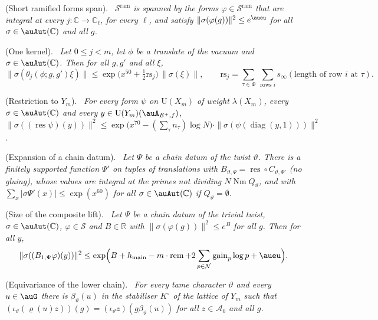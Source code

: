 \documentclass[10pt]{amsart}
\theoremstyle{definition}
\theoremstyle{remark}
\newcommand{\C}{\mathbb C}
\newcommand{\R}{\mathbb R}
\providecommand{\auAz}{\mathcal A_0}
\providecommand{\auNm}{\operatorname{Nm}}
\providecommand{\auPl}{\Phi}
\providecommand{\auS}{\mathcal S}
\providecommand{\auSram}{\mathcal S^{\mathrm{ram}}}
\providecommand{\auU}{\mathrm U}
\providecommand{\augain}{\operatorname{gain}}
\providecommand{\auhmain}{h_{\mathrm{main}}}
\providecommand{\aurem}{\operatorname{rem}}
\providecommand{\ausinf}{s_\infty}
\newenvironment{quotedthm}[2]{\par\medskip\noindent\begingroup
  \textbf{#1}#2.\ \itshape\ignorespaces}{\endgroup\par\medskip}
\begin{document}
\begin{quotedthm}{\cite[Proposition~14.22]{P46}}{ (Short ramified forms span)}
$\auSram$ is spanned by the forms $\varphi\in\auSram$ that are integral at every
$j\colon\C\to\C_\ell$, for every $\ell$, and satisfy $\|\sigma(\varphi(g))\|^2\le e^{\aueu}$ for
all $\sigma\in\auAut(\C)$ and all $g$.
\end{quotedthm}

\begin{quotedthm}{\cite[Proposition~14.23]{P46}}{ (One kernel)}
Let $0\le j<m$, let $\phi$ be a translate of the vacuum and $\sigma\in\auAut(\C)$. Then for all
$g,g'$ and all $\xi$,
\[
\|\sigma(\theta_j(\phi;g,g')\xi)\|\le\exp\bigl(x^{50}+\tfrac12\mathrm{rs}_j\bigr)\,\|\sigma(\xi)\|,
\qquad\mathrm{rs}_j=\sum_{\tau\in\auPl}\ \sum_{\text{rows }i}\ausinf(\text{length of row }i
\text{ at }\tau).
\]
\end{quotedthm}

\begin{quotedthm}{\cite[Proposition~14.24]{P46}}{ (Restriction to $Y_m$)}
For every form $\psi$ on $\auU(X_m)$ of weight $\lambda(X_m)$, every $\sigma\in\auAut(\C)$ and
every $y\in\auU(Y_m)(\auA_{E^+,f})$,
$\|\sigma((\operatorname{res}\psi)(y))\|^2\le\exp\bigl(x^{70}-(\sum_\tau n_\tau)\log N\bigr)\cdot
\|\sigma(\psi(\operatorname{diag}(y,1)))\|^2$.
\end{quotedthm}

\begin{quotedthm}{\cite[Proposition~14.25]{P46}}{ (Expansion of a chain datum)}
Let $\Psi$ be a chain datum of the twist $\vartheta$. There is a finitely supported function
$\Psi'$ on tuples of translations with $B_{\vartheta,\Psi}=\operatorname{res}\circ C_{\vartheta,
\Psi'}$ (no gluing), whose values are integral at the primes not dividing $N\auNm Q_\vartheta$,
and with $\sum_x|\sigma\Psi'(x)|\le\exp(x^{60})$ for all $\sigma\in\auAut(\C)$ if
$Q_\vartheta=\emptyset$.
\end{quotedthm}

\begin{quotedthm}{\cite[Proposition~14.26]{P46}}{ (Size of the composite lift)}
Let $\Psi$ be a chain datum of the trivial twist, $\sigma\in\auAut(\C)$, $\varphi\in\auS$ and
$B\in\R$ with $\|\sigma(\varphi(g))\|^2\le e^B$ for all $g$. Then for all $y$,
\[
\|\sigma((B_{1,\Psi}\varphi)(y))\|^2\le\exp\Bigl(B+\auhmain-m\cdot\aurem+2\sum_{p\in\mathcal N}
\augain_p\log p+\aueu\Bigr).
\]
\end{quotedthm}

\begin{quotedthm}{\cite[Proposition~14.27]{P46}}{ (Equivariance of the lower chain)}
For every tame character $\vartheta$ and every $u\in\auG$ there is $\beta_\vartheta(u)$ in the
stabiliser $K^\circ$ of the lattice of $Y_m$ such
that $(\iota_\vartheta(\varrho(u)z))(g)=(\iota_\vartheta z)(g\beta_\vartheta(u))$ for all
$z\in\auAz$ and all $g$.
\end{quotedthm}
\end{document}
